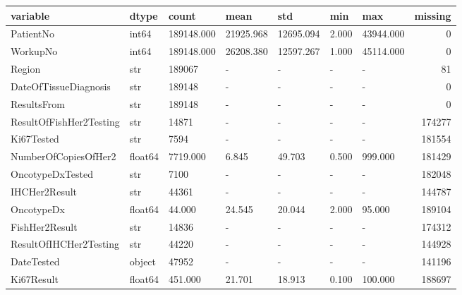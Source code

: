 \begin{tabular}{lllllllr}
\toprule
variable & dtype & count & mean & std & min & max & missing \\
\midrule
PatientNo & int64 & 189148.000 & 21925.968 & 12695.094 & 2.000 & 43944.000 & 0 \\
WorkupNo & int64 & 189148.000 & 26208.380 & 12597.267 & 1.000 & 45114.000 & 0 \\
Region & str & 189067 & - & - & - & - & 81 \\
DateOfTissueDiagnosis & str & 189148 & - & - & - & - & 0 \\
ResultsFrom & str & 189148 & - & - & - & - & 0 \\
ResultOfFishHer2Testing & str & 14871 & - & - & - & - & 174277 \\
Ki67Tested & str & 7594 & - & - & - & - & 181554 \\
NumberOfCopiesOfHer2 & float64 & 7719.000 & 6.845 & 49.703 & 0.500 & 999.000 & 181429 \\
OncotypeDxTested & str & 7100 & - & - & - & - & 182048 \\
IHCHer2Result & str & 44361 & - & - & - & - & 144787 \\
OncotypeDx & float64 & 44.000 & 24.545 & 20.044 & 2.000 & 95.000 & 189104 \\
FishHer2Result & str & 14836 & - & - & - & - & 174312 \\
ResultOfIHCHer2Testing & str & 44220 & - & - & - & - & 144928 \\
DateTested & object & 47952 & - & - & - & - & 141196 \\
Ki67Result & float64 & 451.000 & 21.701 & 18.913 & 0.100 & 100.000 & 188697 \\
\bottomrule
\end{tabular}
